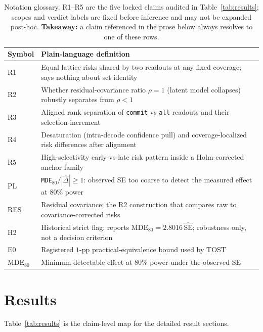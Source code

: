 \documentclass{article}
\begin{document}
\begin{table}[!htbp]
\caption{Notation glossary.  R1--R5 are the five locked claims audited in
Table~\ref{tab:results}; scopes and verdict labels are fixed before inference and may not be
expanded post-hoc.
\textbf{Takeaway:} a claim referenced in the prose below always resolves to one of these rows.}
\label{tab:glossary}
\centering\small
\begin{tabularx}{\linewidth}{@{}l>{\raggedright\arraybackslash}X@{}}
\toprule
Symbol & Plain-language definition \\
\midrule
R1 & Equal lattice risks shared by two readouts at any fixed coverage; says nothing about set identity \\
R2 & Whether residual-covariance ratio $\rho=1$ (latent model collapses) robustly separates from $\rho<1$ \\
R3 & Aligned rank separation of \texttt{commit} vs \texttt{all} readouts and their selection-increment \\
R4 & Desaturation (intra-decode confidence pull) and coverage-localized risk differences after alignment \\
R5 & High-selectivity early-vs-late risk pattern inside a Holm-corrected anchor family \\
PL & \texttt{MDE}$_{80}/|\hat\Delta|\ge1$: observed SE too coarse to detect the measured effect at 80\% power \\
RES & Residual covariance; the R2 construction that compares raw to covariance-corrected risks \\
H2 & Historical strict flag: reports $\mathrm{MDE}_{80}=2.8016\,\widehat{\mathrm{SE}}$; robustness only, not a decision criterion \\
E0 & Registered $1$-pp practical-equivalence bound used by TOST \\
MDE$_{80}$ & Minimum detectable effect at 80\% power under the observed SE \\
\bottomrule
\end{tabularx}
\end{table}

\section{Results}
\label{sec:results}

Table~\ref{tab:results} is the claim-level map for the detailed result sections.
\end{document}
